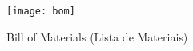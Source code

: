 \documentclass[../monografia.tex]{subfiles}
\begin{document}
\begin{figure}
\texttt{[image: bom]}
\label{fig:img1}
\caption{Bill of Materials (Lista de Materiais)}
\end{figure}
\end{document}
